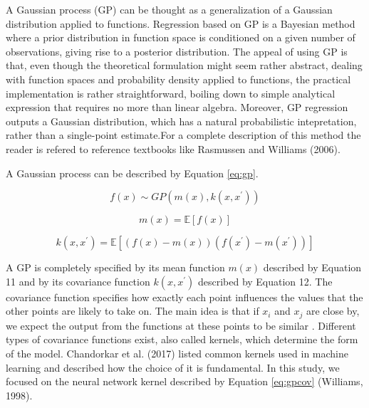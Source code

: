  A Gaussian process (GP) can be thought as a generalization of a Gaussian distribution applied to functions. 
 Regression based on GP is a Bayesian method where a prior distribution in function space is conditioned on a 
 given number of observations, giving rise to a posterior distribution. The appeal of using GP is that, even 
 though the theoretical formulation might seem rather abstract, dealing with function spaces and probability 
 density applied to functions, the practical implementation is rather straightforward, boiling down to simple 
 analytical expression that requires no more than linear algebra. Moreover, GP regression outputs a Gaussian 
 distribution, which has a natural probabilistic intepretation, rather than a single-point estimate.For a complete 
 description of this method the reader is refered to reference textbooks like Rasmussen and Williams (2006). 

A Gaussian process can be described by Equation \ref{eq:gp}. 

\begin{equation}\label{eq:gp}
 f \left( x \right)  \sim  GP \left( m \left( x \right) , k \left( x,x^{'} \right)  \right) 
\end{equation}

\begin{equation}\label{eq:meanfunc}
 m \left( x \right) = \mathbb{E} \left[ f \left( x \right)  \right]
\end{equation}

\begin{equation}\label{eq:kernelfunc}
 k ( x,x^{'}) = \mathbb{E} \left[  \left( f \left( x \right) -m \left( x \right)  \right)  ( f ( x^{'} ) -m ( x^{'}) )  \right]
\end{equation}


A GP is completely specified by its mean function  \( m \left( x \right)  \) described by 
Equation 11 and by its covariance function  \( k \left( x,x^{'} \right)  \)  described by Equation 12. 
The covariance function specifies how exactly each point influences the values that the other points are 
likely to take on. The main idea is that if  \( x_{i} \) and  \( x_{j} \)  are close by, 
we expect the output from the functions at these points to be similar . Different types of covariance 
functions exist, also called kernels, which determine the form of the model. Chandorkar et al. (2017) 
listed common kernels used in machine learning and described how the choice of it is fundamental. 
In this study, we focused on the neural network kernel described by Equation \ref{eq:gpcov} (Williams, 1998). 


